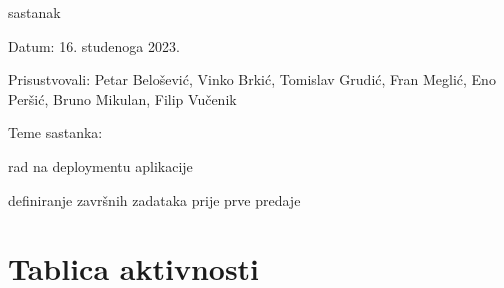 \begin{packed_enum}
			\item  sastanak
			\item[] \begin{packed_item}
				\item Datum: 16. studenoga 2023.
				\item Prisustvovali: Petar Belošević, Vinko Brkić, Tomislav Grudić, Fran Meglić, Eno Peršić, Bruno Mikulan, Filip Vučenik
				\item Teme sastanka:
				\begin{packed_item}
					\item rad na deploymentu aplikacije
					\item definiranje završnih zadataka prije prve predaje
				\end{packed_item}
			\end{packed_item}
			
		\end{packed_enum}
		
		\eject
		\section*{Tablica aktivnosti}

